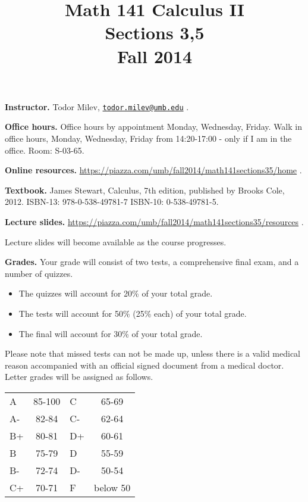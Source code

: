 \documentclass{article}
\title{Math 141 Calculus II \\ Sections 3,5 \\ Fall 2014}
\date{}
\begin{document}
\maketitle

\noindent \textbf{Instructor.} Todor Milev, \href{mailto:todor.milev@umb.edu}{\nolinkurl{todor.milev@umb.edu}} \quad \quad \quad .

\medskip
\noindent \textbf{Office hours. } Office hours by appointment Monday, Wednesday, Friday. Walk in office hours, Monday, Wednesday, Friday from 14:20-17:00 - only if I am in the office. Room: S-03-65.

\medskip
\noindent \textbf{Online resources. }  \url{https://piazza.com/umb/fall2014/math141sections35/home}  \quad \quad \quad .


\medskip\noindent \textbf{Textbook. }  James Stewart, Calculus, 7th edition, published by Brooks Cole, 2012. ISBN-13: 978-0-538-49781-7
ISBN-10: 0-538-49781-5.

\medskip \noindent \textbf{Lecture slides. }  \url{https://piazza.com/umb/fall2014/math141sections35/resources} \quad \quad \quad .

\medskip\noindent Lecture slides will become available as the course progresses.



\medskip
\noindent \textbf{Grades.} Your grade will consist of two tests, a comprehensive final exam, and a number of quizzes. 
\begin{itemize}
\item The quizzes will account for 20\% of your total grade.
\item The tests will account for 50\% (25\% each) of your total grade.
\item The final will account for 30\% of your total grade.
\end{itemize}
Please note that missed tests can not be made up, unless there is a valid medical reason accompanied with an official signed document from a medical doctor. Letter grades will be assigned as follows. 

\begin{center}
\begin{tabular}{lc|lc}
A & 85-100 & C & 65-69 \\
A-& 82-84 & C- & 62-64 \\
B+& 80-81 & D+ & 60-61 \\
B & 75-79& D & 55-59\\
B-& 72-74& D- & 50-54\\
C+& 70-71& F & below 50\\
\end{tabular}

\end{center}
\end{document}
